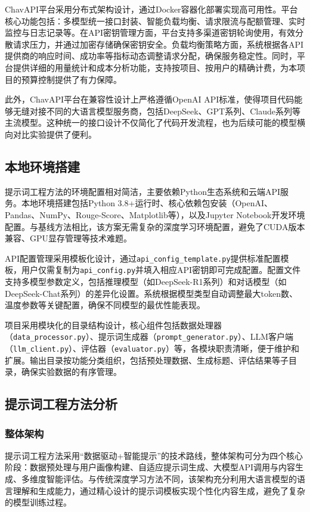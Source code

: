 \documentclass[10pt,a4paper]{article}
\begin{document}
ChavAPI平台采用分布式架构设计，通过Docker容器化部署实现高可用性。平台核心功能包括：多模型统一接口封装、智能负载均衡、请求限流与配额管理、实时监控与日志记录等。在API密钥管理方面，平台支持多渠道密钥轮询使用，有效分散请求压力，并通过加密存储确保密钥安全。负载均衡策略方面，系统根据各API提供商的响应时间、成功率等指标动态调整请求分配，确保服务稳定性。同时，平台提供详细的用量统计和成本分析功能，支持按项目、按用户的精确计费，为本项目的预算控制提供了有力保障。

此外，ChavAPI平台在兼容性设计上严格遵循OpenAI API标准，使得项目代码能够无缝对接不同的大语言模型服务商，包括DeepSeek、GPT系列、Claude系列等主流模型。这种统一的接口设计不仅简化了代码开发流程，也为后续可能的模型横向对比实验提供了便利。

\subsection{本地环境搭建}
提示词工程方法的环境配置相对简洁，主要依赖Python生态系统和云端API服务。本地环境搭建包括Python 3.8+运行时、核心依赖包安装（OpenAI、Pandas、NumPy、Rouge-Score、Matplotlib等），以及Jupyter Notebook开发环境配置。与基线方法相比，该方案无需复杂的深度学习环境配置，避免了CUDA版本兼容、GPU显存管理等技术难题。

API配置管理采用模板化设计，通过\texttt{api\_config\_template.py}提供标准配置模板，用户仅需复制为\texttt{api\_config.py}并填入相应API密钥即可完成配置。配置文件支持多模型参数定义，包括推理模型（如DeepSeek-R1系列）和对话模型（如DeepSeek-Chat系列）的差异化设置。系统根据模型类型自动调整最大token数、温度参数等关键配置，确保不同模型的最优性能表现。

项目采用模块化的目录结构设计，核心组件包括数据处理器（\texttt{data\_processor.py}）、提示词生成器（\texttt{prompt\_generator.py}）、LLM客户端（\texttt{llm\_client.py}）、评估器（\texttt{evaluator.py}）等，各模块职责清晰，便于维护和扩展。输出目录按功能分类组织，包括预处理数据、生成标题、评估结果等子目录，确保实验数据的有序管理。

\subsection{提示词工程方法分析}
\subsubsection{整体架构}
提示词工程方法采用“数据驱动+智能提示”的技术路线，整体架构可分为四个核心阶段：数据预处理与用户画像构建、自适应提示词生成、大模型API调用与内容生成、多维度智能评估。与传统深度学习方法不同，该架构充分利用大语言模型的语言理解和生成能力，通过精心设计的提示词模板实现个性化内容生成，避免了复杂的模型训练过程。
\end{document}
